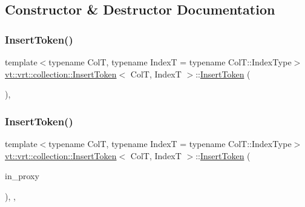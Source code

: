 \subsection{Constructor \& Destructor Documentation}
\mbox{\label{structvt_1_1vrt_1_1collection_1_1_insert_token_afd6ad3de1a56731cfb368fab1c1c5c89}} 
\subsubsection{\texorpdfstring{Insert\+Token()}{InsertToken()}\hspace{0.1cm}{\footnotesize\ttfamily [1/4]}}
{\footnotesize\ttfamily template$<$typename ColT, typename IndexT = typename Col\+T\+::\+Index\+Type$>$ \\
\hyperlink{structvt_1_1vrt_1_1collection_1_1_insert_token}{vt\+::vrt\+::collection\+::\+Insert\+Token}$<$ ColT, IndexT $>$\+::\hyperlink{structvt_1_1vrt_1_1collection_1_1_insert_token}{Insert\+Token} (\begin{DoxyParamCaption}{ }\end{DoxyParamCaption})\hspace{0.3cm}{\ttfamily [private]}, {\ttfamily [default]}}

\mbox{\label{structvt_1_1vrt_1_1collection_1_1_insert_token_afe7a118bb642d9d7af7be61240672630}} 
\subsubsection{\texorpdfstring{Insert\+Token()}{InsertToken()}\hspace{0.1cm}{\footnotesize\ttfamily [2/4]}}
{\footnotesize\ttfamily template$<$typename ColT, typename IndexT = typename Col\+T\+::\+Index\+Type$>$ \\
\hyperlink{structvt_1_1vrt_1_1collection_1_1_insert_token}{vt\+::vrt\+::collection\+::\+Insert\+Token}$<$ ColT, IndexT $>$\+::\hyperlink{structvt_1_1vrt_1_1collection_1_1_insert_token}{Insert\+Token} (\begin{DoxyParamCaption}\item[{\hyperlink{namespacevt_a1b417dd5d684f045bb58a0ede70045ac}{Virtual\+Proxy\+Type} const \&}]{in\+\_\+proxy }\end{DoxyParamCaption})\hspace{0.3cm}{\ttfamily [inline]}, {\ttfamily [explicit]}, {\ttfamily [private]}}

